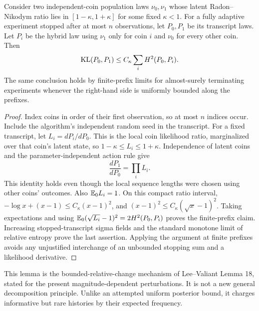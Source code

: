 \begin{lemma}\label{loc:lem:hybrid}
Consider two independent-coin population laws $\nu_0,\nu_1$ whose latent Radon--Nikodym ratio lies in $[1-\kappa,1+\kappa]$ for some fixed $\kappa<1$. For a fully adaptive experiment stopped after at most $n$ observations, let $P_0,P_1$ be its transcript laws. Let $P_i$ be the hybrid law using $\nu_1$ only for coin $i$ and $\nu_0$ for every other coin. Then
\[
 \operatorname{KL}(P_0,P_1)\le C_\kappa\sum_i H^2(P_0,P_i).
\]
The same conclusion holds by finite-prefix limits for almost-surely terminating experiments whenever the right-hand side is uniformly bounded along the prefixes.
\end{lemma}
\begin{proof}
Index coins in order of their first observation, so at most $n$ indices occur. Include the algorithm's independent random seed in the transcript. For a fixed transcript, let $L_i=dP_i/dP_0$. This is the local coin likelihood ratio, marginalized over that coin's latent state, so $1-\kappa\le L_i\le1+\kappa$. Independence of latent coins and the parameter-independent action rule give
\[
 \frac{dP_1}{dP_0}=\prod_iL_i.
\]
This identity holds even though the local sequence lengths were chosen using other coins' outcomes. Also $\mathbb E_0L_i=1$. On this compact ratio interval,
$-\log x+(x-1)\le C_\kappa(x-1)^2$, and
$(x-1)^2\le C_\kappa(\sqrt x-1)^2$. Taking expectations and using
$\mathbb E_0(\sqrt{L_i}-1)^2=2H^2(P_0,P_i)$ proves the finite-prefix claim. Increasing stopped-transcript sigma fields and the standard monotone limit of relative entropy prove the last assertion. Applying the argument at finite prefixes avoids any unjustified interchange of an unbounded stopping sum and a likelihood derivative.
\end{proof}

This lemma is the bounded-relative-change mechanism of Lee--Valiant Lemma 18, stated for the present magnitude-dependent perturbations. It is not a new general decomposition principle. Unlike an attempted uniform posterior bound, it charges informative but rare histories by their expected frequency.

